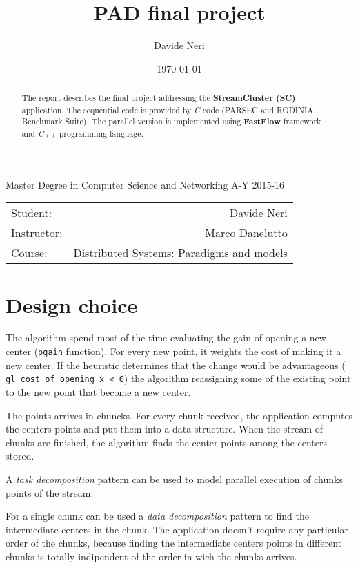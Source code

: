 \documentclass[12pt]{article}
\title{PAD final project}
\author{Davide Neri}
\date{\today}
\begin{document}
\maketitle    %
\begin{center}
Master Degree in Computer Science and Networking 
A-Y 2015-16

\end{center}

\begin{center}

\begin{tabular}{l r}
Student: & Davide Neri \\ %
Instructor: & Marco Danelutto \\%
Course: & Distributed Systems: Paradigms and models\\
\end{tabular}
\end{center}

\begin{abstract} 
The report describes the final project addressing the \textbf{StreamCluster (SC)} application. The sequential code is provided by \emph{C} code (PARSEC and RODINIA Benchmark Suite). The parallel version is implemented using \textbf{FastFlow} framework and \emph{C++} programming language.
\end{abstract}

\section{Design choice}

The algorithm spend most of the time evaluating the gain of opening a new center (\texttt{pgain} function).  For every new point, it weights the cost of making it a new center. If the heuristic determines that the change would be advantageous  ( \texttt{gl_cost_of_opening_x < 0}) the algorithm reassigning some of the existing point to the new point that become a new center.

The points arrives in chuncks. For every chunk received, the application  computes the centers points and put them into a data structure. When the stream of chunks are finished, the algorithm finds the center points among the centers stored.

A \emph{task decomposition} pattern can be used  to model parallel execution of chunks points of the stream.

For a single chunk  can be used a \emph{data decomposition} pattern to find the intermediate centers in the chunk.
The application doesn't require any particular order of the chunks, because finding the intermediate centers points in different chunks is totally indipendent of the order in wich the chunks arrives.
\end{document}
